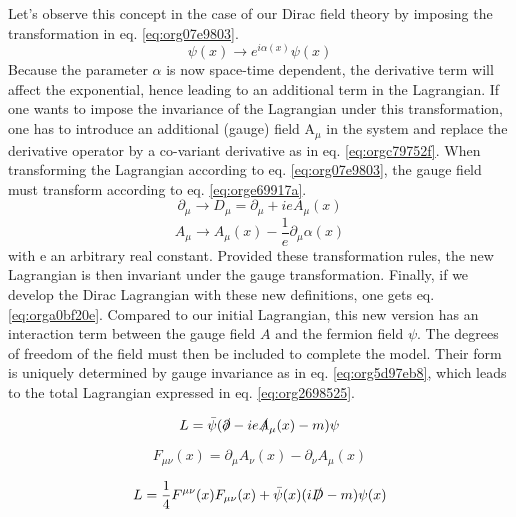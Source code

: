 \begin{enumerate}
Let's observe this concept in the case of our Dirac field theory by imposing the transformation in eq. \ref{eq:org07e9803}.
\begin{equation}
\label{eq:org07e9803}
\psi(x)\rightarrow e^{i\alpha(x)}\psi(x)
\end{equation}
Because the parameter \(\alpha\) is now space-time dependent, the derivative term will affect the exponential, hence leading to an additional term in the Lagrangian.
If one wants to impose the invariance of the Lagrangian under this transformation, one has to introduce an additional (gauge) field A\(_{\mu}\) in the system and replace the derivative operator by a co-variant derivative as in eq. \ref{eq:orgc79752f}.
When transforming the Lagrangian according to eq. \ref{eq:org07e9803}, the gauge field must transform according to eq. \ref{eq:orge69917a}.
\begin{equation}
\label{eq:orgc79752f}
\partial_\mu\rightarrow D_\mu=\partial_\mu+ieA_\mu(x)
\end{equation}
\begin{equation}
\label{eq:orge69917a}
A_{\mu} \rightarrow A_\mu(x) - \frac{1}{e} {\partial_{\mu} \alpha(x)}
\end{equation}
with e an arbitrary real constant.
Provided these transformation rules, the new Lagrangian is then invariant under the gauge transformation.
Finally, if we develop the Dirac Lagrangian with these new definitions, one gets eq. \ref{eq:orga0bf20e}.
Compared to our initial Lagrangian, this new version has an interaction term between the gauge field \(A\) and the fermion field \(\psi\).
The degrees of freedom of the field must then be included to complete the model.
Their form is uniquely determined by gauge invariance as in eq. \ref{eq:org5d97eb8}, which leads to the total Lagrangian expressed in eq. \ref{eq:org2698525}.


\begin{equation}
\label{eq:orga0bf20e}
L = \bar{\psi}(\slashed{\partial} - ie\slashed{A}_\mu(x)-m)\psi
\end{equation}

\begin{equation}
\label{eq:org5d97eb8}
F_{\mu\nu}(x) = \partial_\mu A_\nu(x) - \partial_\nu A_\mu (x)
\end{equation}

\begin{equation}
\label{eq:org2698525}
L = \frac{1}{4} F^{\mu\nu}(x) F_{\mu\nu}(x) + \bar{\psi}(x)(i\slashed{D}-m)\psi(x)
\end{equation}


\end{enumerate}
